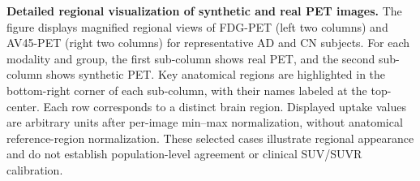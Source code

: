 \caption{
\textbf{Detailed regional visualization of synthetic and real PET images.}
The figure displays magnified regional views of FDG-PET (left two columns) and AV45-PET (right two columns) for representative AD and CN subjects. 
For each modality and group, the first sub-column shows real PET, and the second sub-column shows synthetic PET. 
Key anatomical regions are highlighted in the bottom-right corner of each sub-column, with their names labeled at the top-center. 
Each row corresponds to a distinct brain region. Displayed uptake values are arbitrary units after per-image min--max normalization, without anatomical reference-region normalization. These selected cases illustrate regional appearance and do not establish population-level agreement or clinical SUV/SUVR calibration.
}
    \label{fig:3}
